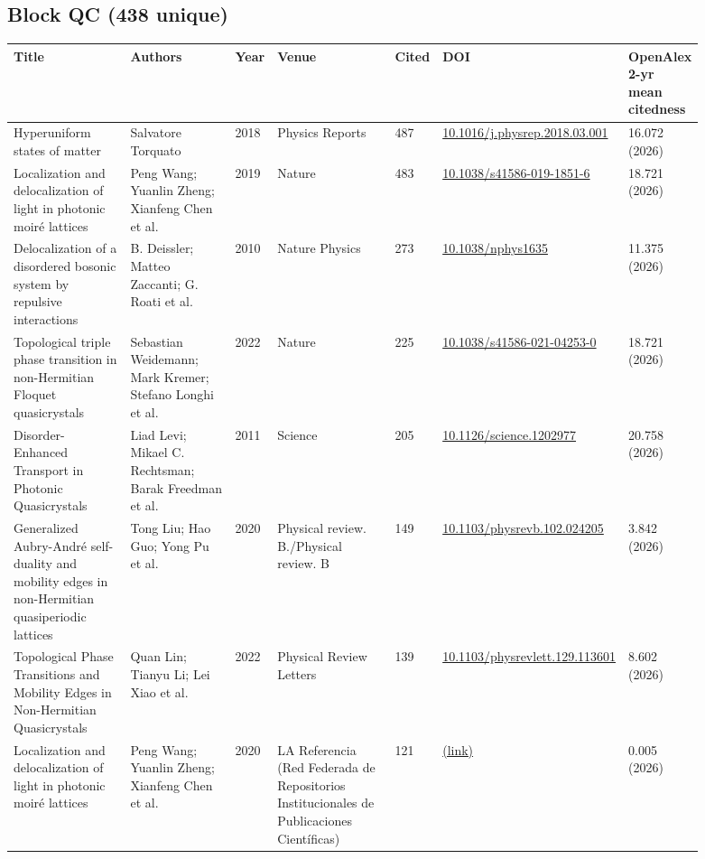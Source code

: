 \documentclass[10pt,a4paper]{article}
\begin{document}
\subsection*{Block QC (438 unique)}
{\scriptsize\begin{longtable}{p{0.204\linewidth}p{0.188\linewidth}p{0.043\linewidth}p{0.204\linewidth}p{0.043\linewidth}p{0.108\linewidth}p{0.102\linewidth}}
\hline
\textbf{Title} & \textbf{Authors} & \textbf{Year} & \textbf{Venue} & \textbf{Cited} & \textbf{DOI} & \textbf{OpenAlex 2-yr mean citedness} \\ \hline
\endhead
Hyperuniform states of matter & Salvatore Torquato & 2018 & Physics Reports & 487 & \href{https://doi.org/10.1016/j.physrep.2018.03.001}{10.1016/j.physrep.2018.03.001} & 16.072 (2026) \\
Localization and delocalization of light in photonic moiré lattices & Peng Wang; Yuanlin Zheng; Xianfeng Chen et al. & 2019 & Nature & 483 & \href{https://doi.org/10.1038/s41586-019-1851-6}{10.1038/s41586-019-1851-6} & 18.721 (2026) \\
Delocalization of a disordered bosonic system by repulsive interactions & B. Deissler; Matteo Zaccanti; G. Roati et al. & 2010 & Nature Physics & 273 & \href{https://doi.org/10.1038/nphys1635}{10.1038/nphys1635} & 11.375 (2026) \\
Topological triple phase transition in non-Hermitian Floquet quasicrystals & Sebastian Weidemann; Mark Kremer; Stefano Longhi et al. & 2022 & Nature & 225 & \href{https://doi.org/10.1038/s41586-021-04253-0}{10.1038/s41586-021-04253-0} & 18.721 (2026) \\
Disorder-Enhanced Transport in Photonic Quasicrystals & Liad Levi; Mikael C. Rechtsman; Barak Freedman et al. & 2011 & Science & 205 & \href{https://doi.org/10.1126/science.1202977}{10.1126/science.1202977} & 20.758 (2026) \\
Generalized Aubry-André self-duality and mobility edges in non-Hermitian quasiperiodic lattices & Tong Liu; Hao Guo; Yong Pu et al. & 2020 & Physical review. B./Physical review. B & 149 & \href{https://doi.org/10.1103/physrevb.102.024205}{10.1103/physrevb.102.024205} & 3.842 (2026) \\
Topological Phase Transitions and Mobility Edges in Non-Hermitian Quasicrystals & Quan Lin; Tianyu Li; Lei Xiao et al. & 2022 & Physical Review Letters & 139 & \href{https://doi.org/10.1103/physrevlett.129.113601}{10.1103/physrevlett.129.113601} & 8.602 (2026) \\
Localization and delocalization of light in photonic moiré lattices & Peng Wang; Yuanlin Zheng; Xianfeng Chen et al. & 2020 & LA Referencia (Red Federada de Repositorios Institucionales de Publicaciones Científicas) & 121 & \href{https://openalex.org/W3102201054}{(link)} & 0.005 (2026) \\

\end{longtable}}
\end{document}

